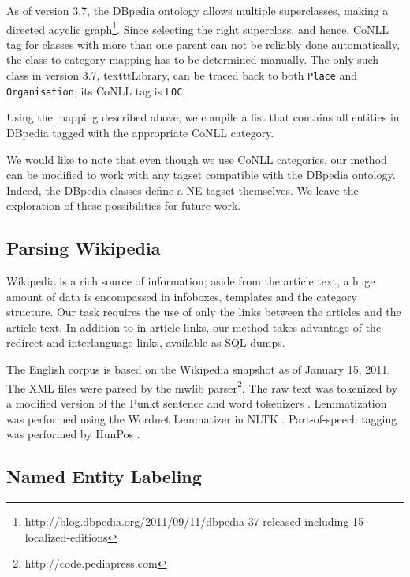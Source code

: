 \documentclass[11pt]{article}
\begin{document}
As of version 3.7, the DBpedia ontology allows multiple superclasses, making a directed acyclic graph\footnote{http://blog.dbpedia.org/2011/09/11/dbpedia-37-released-including-15-localized-editions}. Since selecting the right superclass, and hence, CoNLL tag for classes with more than one parent can not be reliably done automatically, the class-to-category mapping has to be determined manually. The only such class in version 3.7, texttt{Library}, can be traced back to both \texttt{Place} and \texttt{Organisation}; its CoNLL tag is \texttt{LOC}.


Using the mapping described above, we compile a list that contains all entities in DBpedia tagged with the appropriate CoNLL category.

We would like to note that even though we use CoNLL categories, our method can be modified to work with any tagset compatible with the DBpedia ontology. Indeed, the DBpedia classes define a NE tagset themselves. We leave the exploration of these possibilities for future work.

\subsection{Parsing Wikipedia}

Wikipedia is a rich source of information; aside from the article text, a huge amount of data is encompassed in infoboxes, templates and the category structure. Our task requires the use of only the links between the articles and the article text. In addition to in-article links, our method takes advantage of the redirect and interlanguage links, available as SQL dumps.

The English corpus is based on the Wikipedia snapshot as of January 15, 2011. The XML files were parsed by the mwlib parser\footnote{http://code.pediapress.com}. The raw text was tokenized by a modified version of the Punkt sentence and word tokenizers \cite{Kiss:06}. Lemmatization was performed using the Wordnet Lemmatizer in NLTK \cite{Bird:09}. Part-of-speech tagging was performed by HunPos \cite{Halacsy:07}.


\subsection{Named Entity Labeling}
\end{document}
